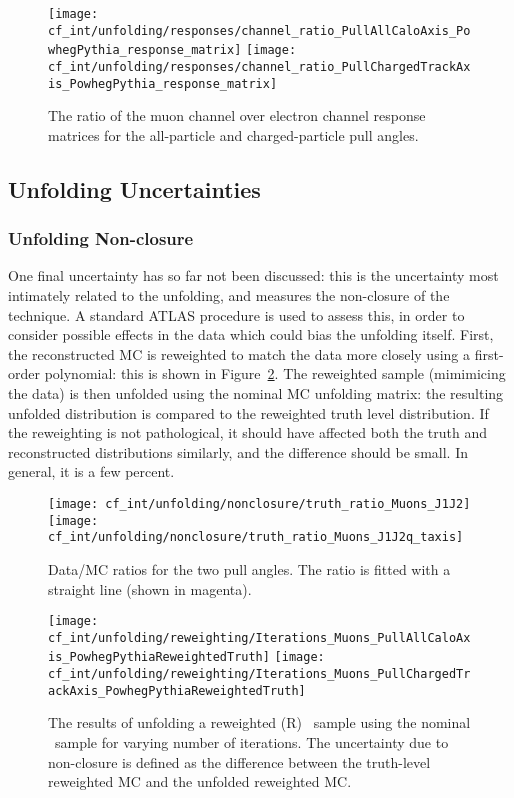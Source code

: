 \begin{figure}
  \texttt{[image: cf\_int/unfolding/responses/channel\_ratio\_PullAllCaloAxis\_PowhegPythia\_response\_matrix]}
  \texttt{[image: cf\_int/unfolding/responses/channel\_ratio\_PullChargedTrackAxis\_PowhegPythia\_response\_matrix]}
  \caption{The ratio of the muon channel over electron channel response matrices
    for the all-particle and charged-particle pull angles.}
  \label{fig:color::unfolding:response_channel_comp}
\end{figure}

	\subsection{Unfolding Uncertainties}
	\label{chapter:color:unfolding:uncertainties}

	\subsubsection{Unfolding Non-closure}

	One final uncertainty has so far not been discussed: this is the uncertainty most intimately related to the unfolding, and measures the non-closure of the technique. A standard ATLAS procedure is used to assess this, in order to consider possible effects in the data which could bias the unfolding itself. First, the reconstructed MC is reweighted to match the data more closely using a first-order polynomial: this is shown in Figure~\ref{fig:color:unfolding:datamc_ratio}. The reweighted sample (mimimicing the data) is then unfolded using the nominal MC unfolding matrix: the resulting unfolded distribution is compared to the reweighted truth level distribution. If the reweighting is not pathological, it should have affected both the truth and reconstructed distributions similarly, and the difference should be small. In general, it is a few percent.

\begin{figure}[h!]
  \texttt{[image: cf\_int/unfolding/nonclosure/truth\_ratio\_Muons\_J1J2]}
  \texttt{[image: cf\_int/unfolding/nonclosure/truth\_ratio\_Muons\_J1J2q\_taxis]}
  \caption{Data/MC ratios for the two pull angles. The ratio is fitted with a
    straight line (shown in magenta).}
  \label{fig:color:unfolding:datamc_ratio}
\end{figure}

\begin{figure}[h!]
  \texttt{[image: cf\_int/unfolding/reweighting/Iterations\_Muons\_PullAllCaloAxis\_PowhegPythiaReweightedTruth]}
  \texttt{[image: cf\_int/unfolding/reweighting/Iterations\_Muons\_PullChargedTrackAxis\_PowhegPythiaReweightedTruth]}
  \caption{The results of unfolding a reweighted (R) \PowPythia\ sample using
    the nominal \PowPythia\ sample for varying number of iterations.
    The uncertainty due to non-closure is defined as the difference
    between the truth-level reweighted MC and the unfolded reweighted MC.}
  \label{fig:color:unfolding:nonclosure}
\end{figure}


